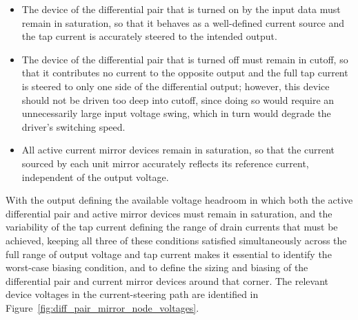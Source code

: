 \begin{itemize}
    \item The device of the differential pair that is turned on by the input data must remain in saturation, so that it behaves as a well-defined current source and the tap current is accurately steered to the intended output.
    \item The device of the differential pair that is turned off must remain in cutoff, so that it contributes no current to the opposite output and the full tap current is steered to only one side of the differential output; however, this device should not be driven too deep into cutoff, since doing so would require an unnecessarily large input voltage swing, which in turn would degrade the driver's switching speed.
    \item All active current mirror devices remain in saturation, so that the current sourced by each unit mirror accurately reflects its reference current, independent of the output voltage.
\end{itemize}


With the output defining the available voltage headroom in which both the active differential pair and active mirror devices must remain in saturation, and the variability of the tap current defining the range of drain currents that must be achieved, keeping all three of these conditions satisfied simultaneously across the full range of output voltage and tap current makes it essential to identify the worst-case biasing condition, and to define the sizing and biasing of the differential pair and current mirror devices around that corner. The relevant device voltages in the current-steering path are identified in Figure~\ref{fig:diff_pair_mirror_node_voltages}.

